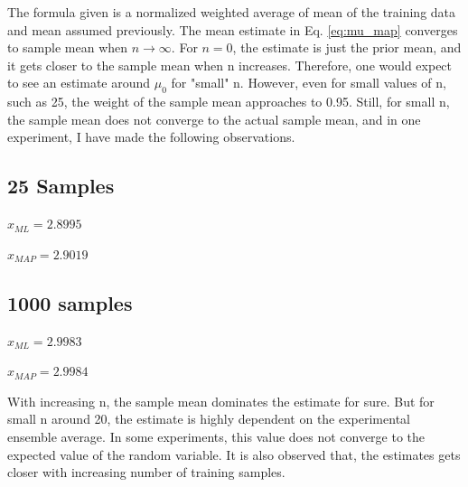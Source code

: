 \documentclass[11pt]{extarticle}
\begin{document}
The formula given is a normalized weighted average of mean of the training data and mean assumed previously.
The mean estimate in Eq. \ref{eq:mu_map} converges to sample mean when $n \rightarrow \infty$. For $n=0$, the
estimate is just the prior mean, and it gets closer to the sample mean when n increases. Therefore, one would expect to see an
estimate around $\mu_0$ for "small" n. However,
even for small values of n, such as 25, the weight of the sample mean approaches to 0.95.  Still, for small n,
the sample mean does not converge to the actual sample mean, and in one experiment, I have made the following observations.

\subsection{25 Samples}
\begin{minipage}{0.3\textwidth}
    ${\hat{x}}_{ML} = 2.8995$
\end{minipage}
\begin{minipage}{0.6\textwidth}
    ${\hat{x}}_{MAP} = 2.9019$
\end{minipage}

\subsection{1000 samples}
\begin{minipage}{0.3\textwidth}
    ${\hat{x}}_{ML} = 2.9983$
\end{minipage}
\begin{minipage}{0.6\textwidth}
    ${\hat{x}}_{MAP} = 2.9984$
\end{minipage}
\vspace*{0.5cm}

With increasing n, the sample mean dominates the estimate for sure.
But for small n around 20, the estimate is highly dependent on the experimental ensemble average. In some experiments, this value does not
converge to the expected value of the random variable.
It is also observed that, the estimates gets closer with increasing number of training samples.
\end{document}
